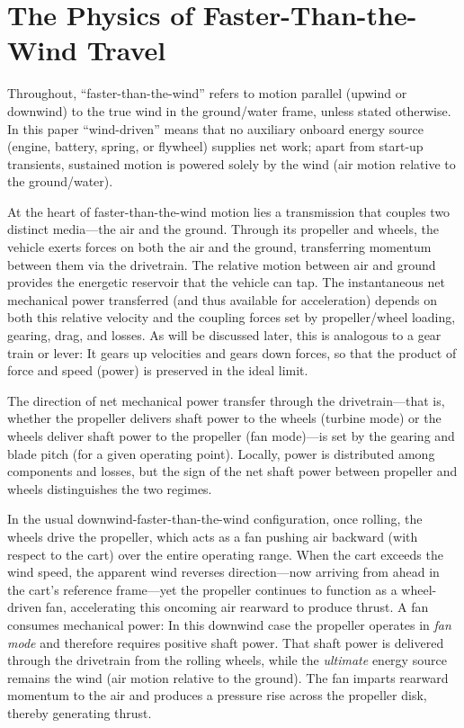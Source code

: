 \documentclass[reprint,aps,pra,longbibliography]{revtex4-2}
\begin{document}
\section{The Physics of Faster-Than-the-Wind Travel}

Throughout, ``faster-than-the-wind'' refers to motion parallel (upwind or downwind) to the true wind in the ground/water frame, unless stated otherwise.
In this paper ``wind-driven'' means that no auxiliary onboard energy source
(engine, battery, spring, or flywheel) supplies net work; apart from start-up
transients, sustained motion is powered solely by the wind (air motion relative
to the ground/water).

At the heart of faster-than-the-wind motion lies a transmission that couples two distinct media---the air and the ground.
Through its propeller and wheels, the vehicle exerts forces on both the air
and the ground, transferring momentum between them via the drivetrain. The relative motion between air and ground provides the energetic reservoir that the vehicle can tap. The instantaneous net mechanical power transferred (and thus available for acceleration) depends on both this relative velocity and the coupling forces set by propeller/wheel loading, gearing, drag, and losses.
As will be discussed later, this is analogous to a gear train or lever: It gears up velocities and gears down forces, so that the product of force and speed (power) is preserved in the ideal limit.

The direction of net mechanical power transfer through the drivetrain---that is, whether the propeller delivers shaft power to the wheels (turbine mode) or the wheels deliver shaft power to the propeller (fan mode)---is set by the gearing and blade pitch (for a given operating point).
Locally, power is distributed among components and losses, but the sign of the net shaft power between propeller and wheels distinguishes the two regimes.

In the usual downwind-faster-than-the-wind configuration, once rolling, the
wheels drive the propeller, which acts as a fan pushing air backward (with
respect to the cart) over the entire operating range. When the cart exceeds the
wind speed, the apparent wind reverses direction---now arriving from ahead in
the cart's reference frame---yet the propeller continues to function as a
wheel-driven fan, accelerating this oncoming air rearward to produce thrust.
A fan consumes mechanical power: In this downwind case the propeller operates in
\emph{fan mode} and therefore requires positive shaft power. That shaft power is
delivered through the drivetrain from the rolling wheels, while the \emph{ultimate}
energy source remains the wind (air motion relative to the ground). The fan
imparts rearward momentum to the air and produces a pressure rise across the
propeller disk, thereby generating thrust.
\end{document}
